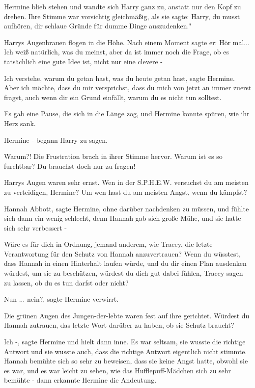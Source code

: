 Hermine blieb stehen und wandte sich Harry ganz zu, anstatt nur den Kopf zu
drehen. Ihre Stimme war vorsichtig gleichmäßig, als sie sagte: \glqq Harry, du
musst aufhören, dir schlaue Gründe für dumme Dinge auszudenken."

Harrys Augenbrauen flogen in die Höhe. Nach einem Moment sagte er: \glqq Hör
mal... Ich weiß natürlich, was du meinst, aber da ist immer noch die Frage, ob
es tatsächlich eine gute Idee ist, nicht nur eine clevere -\grqq{}

\glqq Ich verstehe, warum du getan hast, was du heute getan hast\grqq{}, sagte
Hermine. \glqq Aber ich möchte, dass du mir versprichst, dass du mich von jetzt
an immer zuerst fragst, auch wenn dir ein Grund einfällt, warum du es nicht tun
solltest.\grqq{}

Es gab eine Pause, die sich in die Länge zog, und Hermine konnte spüren, wie ihr
Herz sank.

\glqq Hermine -\grqq{} begann Harry zu sagen.

\glqq Warum?!\grqq{} Die Frustration brach in ihrer Stimme hervor. \glqq Warum
ist es so furchtbar? Du brauchst doch nur zu fragen!\grqq{}

Harrys Augen waren sehr ernst. \glqq Wen in der S.P.H.E.W. versuchst du am
meisten zu verteidigen, Hermine? Um wen hast du am meisten Angst, wenn du
kämpfst?\grqq{}

\glqq Hannah Abbott\grqq{}, sagte Hermine, ohne darüber nachdenken zu müssen,
und fühlte sich dann ein wenig schlecht, denn Hannah gab sich große Mühe, und
sie hatte sich sehr verbessert -

\glqq Wäre es für dich in Ordnung, jemand anderem, wie Tracey, die letzte
Verantwortung für den Schutz von Hannah anzuvertrauen? Wenn du wüsstest, dass
Hannah in einen Hinterhalt laufen würde, und du dir einen Plan ausdenken
würdest, um sie zu beschützen, würdest du dich gut dabei fühlen, Tracey sagen zu
lassen, ob du es tun darfst oder nicht?\grqq{}

\glqq Nun ... nein?\grqq{}, sagte Hermine verwirrt.

Die grünen Augen des Jungen-der-lebte waren fest auf ihre gerichtet. \glqq
Würdest du Hannah zutrauen, das letzte Wort darüber zu haben, ob sie Schutz
braucht?\grqq{}

\glqq Ich -\grqq{}, sagte Hermine und hielt dann inne. Es war seltsam, sie
wusste die richtige Antwort und sie wusste auch, dass die richtige Antwort
eigentlich nicht stimmte. Hannah bemühte sich so sehr zu beweisen, dass sie
keine Angst hatte, obwohl sie es war, und es war leicht zu sehen, wie das
Hufflepuff-Mädchen sich zu sehr bemühte - dann erkannte Hermine die Andeutung.

